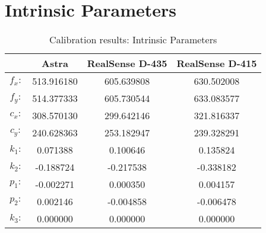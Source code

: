 \appendix
\chapter*{Intrinsic Parameters}
\label{chap:intpara}

\begin{table}[ht]
\renewcommand{\arraystretch}{1.3}
\caption{Calibration results: Intrinsic Parameters}
\label{absolute}
\centering
\begin{tabular}{|c|c|c|c|}
\hline
&Astra&RealSense D-435 & RealSense D-415\\
\hline
$f_{x}:$&513.916180  &605.639808 &630.502008\\
$f_{y}:$&514.377333  &605.730544 &633.083577\\
$c_{x}:$&308.570130  &299.642146 &321.816337\\
$c_{y}:$&240.628363  &253.182947 &239.328291\\
$k_{1}:$&0.071388    &0.100646   &0.135824\\
$k_{2}:$&-0.188724   &-0.217538  &-0.338182\\
$p_{1}:$&-0.002271   &0.000350   &0.004157\\
$p_{2}:$&0.002146    &-0.004858  &-0.006478\\
$k_{3}:$&0.000000    &0.000000   &0.000000\\
\hline
\end{tabular}
\end{table}


